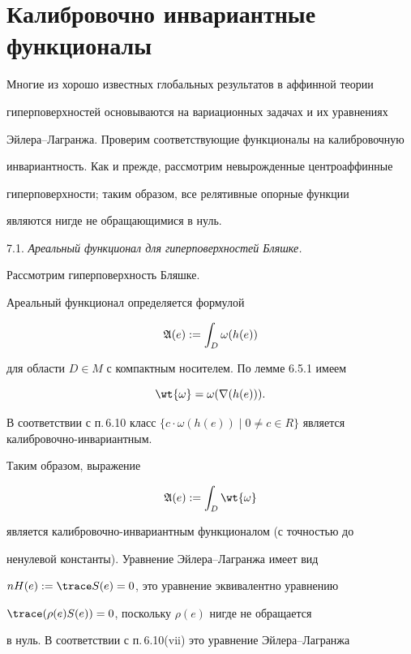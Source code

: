 \section{Калибровочно инвариантные функционалы}



Многие из хорошо известных глобальных результатов в аффинной теории

гиперповерхностей основываются на вариационных задачах и их уравнениях

Эйлера--Лагранжа. Проверим соответствующие функционалы на калибровочную

инвариантность. Как и прежде, рассмотрим невырожденные центроаффинные

гиперповерхности; таким образом, все релятивные опорные функции

являются нигде не обращающимися в нуль.

\medskip



7.1. {\it Ареальный функционал для гиперповерхностей Бляшке.}

Рассмотрим гиперповерхность Бляшке.

Ареальный функционал определяется формулой

$$

\frak A (e) := \int_D \omega(h(e))

$$

для области $D \in M$ с компактным носителем. По лемме 6.5.1 имеем

$$

\wt {\omega} = \omega(\nabla (h(e))).

$$

В соответствии с п.\,6.10 класс $ \{ c \cdot \omega (h(e)) \mid

0 \neq c \in R\}$ является калибровочно-инвариантным.

Таким образом, выражение

$$

\frak {A} (e) := \int_D \wt {\omega}

$$

является калибровочно-инвариантным функционалом (с точностью до

ненулевой константы). Уравнение Эйлера--Лагранжа имеет вид

$nH(e):= \trace S(e) = 0$, это уравнение эквивалентно уравнению

$\trace (\rho (e) S(e)) = 0$, поскольку $\rho (e)$ нигде не обращается

в нуль. В соответствии с п.\,6.10(vii) это уравнение Эйлера--Лагранжа

